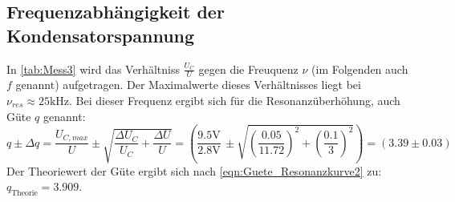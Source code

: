 \subsection{Frequenzabhängigkeit der Kondensatorspannung}
\label{subsec:AuswertungC}
In \autoref{tab:Mess3} wird das Verhältniss $\frac{U_C}{U}$ gegen die Freuquenz $\nu$ (im Folgenden auch $f$ genannt) aufgetragen. Der Maximalwerte dieses Verhältnisses liegt bei $\nu_{res} \approx 25 \unit{\kilo\hertz}$.
Bei dieser Frequenz ergibt sich für die Resonanzüberhöhung, auch Güte $q$ genannt:
\begin{equation}
  q \pm \Delta q = \frac{U_{C,max}}{U} \pm \sqrt{\frac{\Delta U_{C}}{U_{C}} + \frac{\Delta U}{U}}
  = \left(\frac{9.5\unit{\volt}}{2.8\unit{\volt}} \, \pm \sqrt{\left(\frac{0.05}{11.72}\right)^2 + \left(\frac{0.1}{3}\right)^2}\right)
  = \left(3.39 \pm 0.03\right)
\end{equation}
Der Theoriewert der Güte ergibt sich nach \eqref{eqn:Guete_Resonanzkurve2} zu: $q_{\text{Theorie}} = 3.909$.

